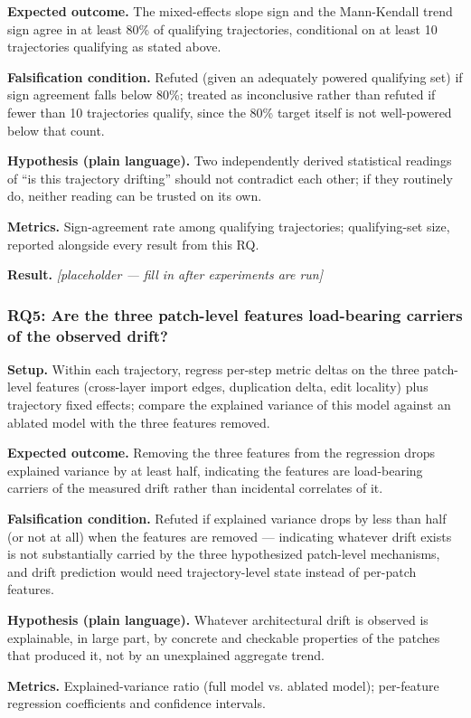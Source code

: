\documentclass[11pt]{article}
\newcommand{\ph}{\textit{[placeholder --- fill in after experiments are run]}}
\begin{document}
\textbf{Expected outcome.} The mixed-effects slope sign and the Mann-Kendall trend sign agree in at least 80\% of qualifying trajectories, conditional on at least 10 trajectories qualifying as stated above.

\textbf{Falsification condition.} Refuted (given an adequately powered qualifying set) if sign agreement falls below 80\%; treated as inconclusive rather than refuted if fewer than 10 trajectories qualify, since the 80\% target itself is not well-powered below that count.

\textbf{Hypothesis (plain language).} Two independently derived statistical readings of ``is this trajectory drifting'' should not contradict each other; if they routinely do, neither reading can be trusted on its own.

\textbf{Metrics.} Sign-agreement rate among qualifying trajectories; qualifying-set size, reported alongside every result from this RQ.

\textbf{Result.} \ph

\subsubsection{RQ5: Are the three patch-level features load-bearing carriers of the observed drift?}
\textbf{Setup.} Within each trajectory, regress per-step metric deltas on the three patch-level features (cross-layer import edges, duplication delta, edit locality) plus trajectory fixed effects; compare the explained variance of this model against an ablated model with the three features removed.

\textbf{Expected outcome.} Removing the three features from the regression drops explained variance by at least half, indicating the features are load-bearing carriers of the measured drift rather than incidental correlates of it.

\textbf{Falsification condition.} Refuted if explained variance drops by less than half (or not at all) when the features are removed --- indicating whatever drift exists is not substantially carried by the three hypothesized patch-level mechanisms, and drift prediction would need trajectory-level state instead of per-patch features.

\textbf{Hypothesis (plain language).} Whatever architectural drift is observed is explainable, in large part, by concrete and checkable properties of the patches that produced it, not by an unexplained aggregate trend.

\textbf{Metrics.} Explained-variance ratio (full model vs. ablated model); per-feature regression coefficients and confidence intervals.
\end{document}
